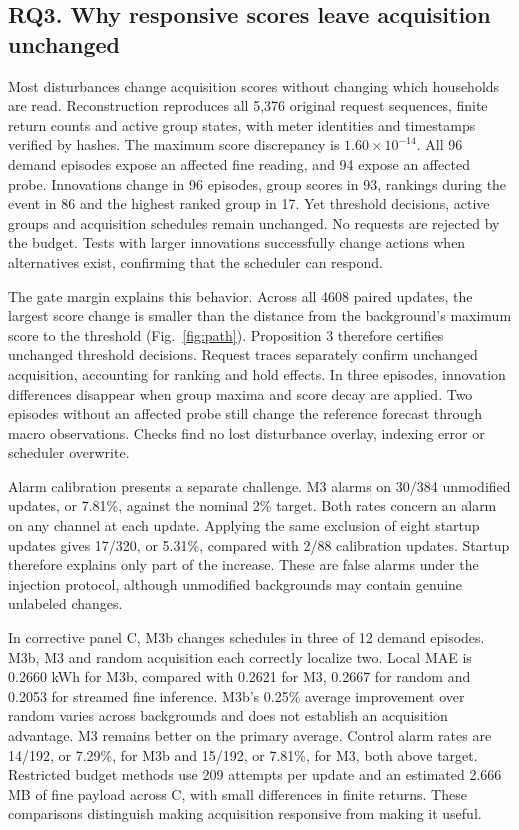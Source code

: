 \documentclass[conference]{IEEEtran}
\newcommand{\MarginChecks}{4608}
\begin{document}
\subsection{RQ3. Why responsive scores leave acquisition unchanged}
Most disturbances change acquisition scores without changing which households are read. Reconstruction reproduces all 5,376 original request sequences, finite return counts and active group states, with meter identities and timestamps verified by hashes. The maximum score discrepancy is $1.60\times10^{-14}$. All 96 demand episodes expose an affected fine reading, and 94 expose an affected probe. Innovations change in 96 episodes, group scores in 93, rankings during the event in 86 and the highest ranked group in 17. Yet threshold decisions, active groups and acquisition schedules remain unchanged. No requests are rejected by the budget. Tests with larger innovations successfully change actions when alternatives exist, confirming that the scheduler can respond.

The gate margin explains this behavior. Across all \MarginChecks{} paired updates, the largest score change is smaller than the distance from the background's maximum score to the threshold (Fig.~\ref{fig:path}). Proposition 3 therefore certifies unchanged threshold decisions. Request traces separately confirm unchanged acquisition, accounting for ranking and hold effects. In three episodes, innovation differences disappear when group maxima and score decay are applied. Two episodes without an affected probe still change the reference forecast through macro observations. Checks find no lost disturbance overlay, indexing error or scheduler overwrite.

Alarm calibration presents a separate challenge. M3 alarms on 30/384 unmodified updates, or 7.81\%, against the nominal 2\% target. Both rates concern an alarm on any channel at each update. Applying the same exclusion of eight startup updates gives 17/320, or 5.31\%, compared with 2/88 calibration updates. Startup therefore explains only part of the increase. These are false alarms under the injection protocol, although unmodified backgrounds may contain genuine unlabeled changes.

In corrective panel C, M3b changes schedules in three of 12 demand episodes. M3b, M3 and random acquisition each correctly localize two. Local MAE is 0.2660 kWh for M3b, compared with 0.2621 for M3, 0.2667 for random and 0.2053 for streamed fine inference. M3b's 0.25\% average improvement over random varies across backgrounds and does not establish an acquisition advantage. M3 remains better on the primary average. Control alarm rates are 14/192, or 7.29\%, for M3b and 15/192, or 7.81\%, for M3, both above target. Restricted budget methods use 209 attempts per update and an estimated 2.666 MB of fine payload across C, with small differences in finite returns. These comparisons distinguish making acquisition responsive from making it useful.
\end{document}
